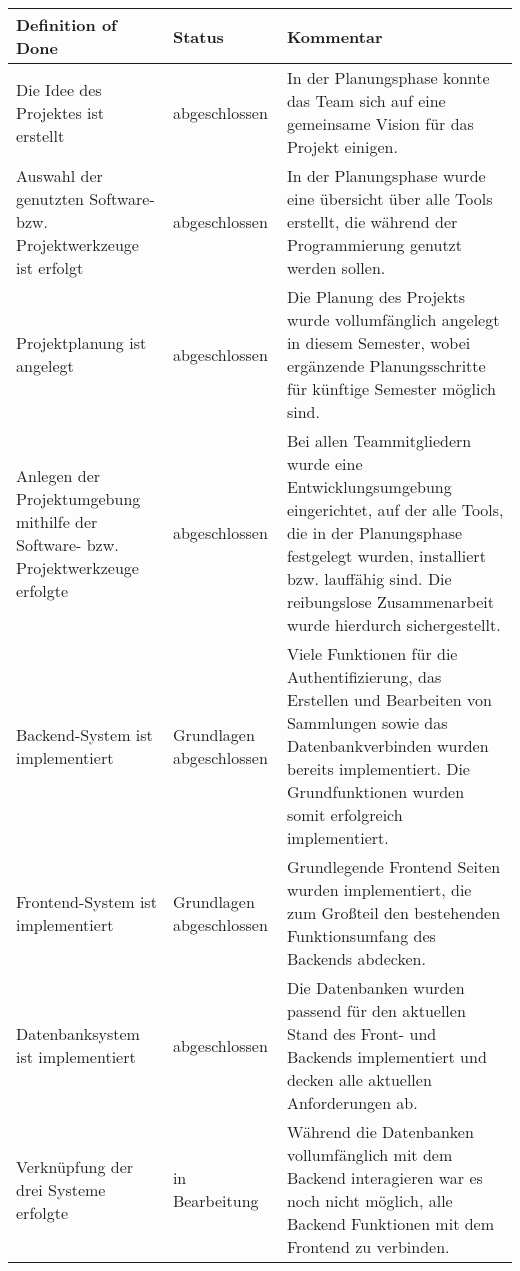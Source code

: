\begin{table}[h]
    \centering
    \begin{tabular}{|p{}|p{}|p{}|}
        \hline
        \textbf{Definition of Done} & \textbf{Status} & \textbf{Kommentar} \\
        \hline
        Die Idee des Projektes ist erstellt &  \cellcolor{green}abgeschlossen & In der Planungsphase konnte das Team sich auf eine gemeinsame Vision für das Projekt einigen. \\
        \hline
        Auswahl der genutzten Software- bzw. Projektwerkzeuge ist erfolgt & \cellcolor{green}abgeschlossen & In der Planungsphase wurde eine übersicht über alle Tools erstellt, die während der Programmierung genutzt werden sollen. \\
        \hline
        Projektplanung ist angelegt & \cellcolor{green}abgeschlossen & Die Planung des Projekts wurde vollumfänglich angelegt in diesem Semester, wobei ergänzende Planungsschritte für künftige Semester möglich sind. \\
        \hline
        Anlegen der Projektumgebung mithilfe der Software- bzw. Projektwerkzeuge erfolgte & \cellcolor{green}abgeschlossen & Bei allen Teammitgliedern wurde eine Entwicklungsumgebung eingerichtet, auf der alle Tools, die in der Planungsphase festgelegt wurden, installiert bzw. lauffähig sind.
        Die reibungslose Zusammenarbeit wurde hierdurch sichergestellt. \\
        \hline
        Backend-System ist implementiert & \cellcolor{green}Grundlagen abgeschlossen & Viele Funktionen für die Authentifizierung, das Erstellen und Bearbeiten von Sammlungen sowie das Datenbankverbinden wurden bereits implementiert.
        Die Grundfunktionen wurden somit erfolgreich implementiert. \\
        \hline
        Frontend-System ist implementiert & \cellcolor{green}Grundlagen abgeschlossen &  Grundlegende Frontend Seiten wurden implementiert, die zum Großteil den bestehenden Funktionsumfang des Backends abdecken.\\
        \hline
        Datenbanksystem ist implementiert & \cellcolor{green}abgeschlossen & Die Datenbanken wurden passend für den aktuellen Stand des Front- und Backends implementiert und decken alle aktuellen Anforderungen ab. \\
        \hline
        Verknüpfung der drei Systeme erfolgte & \cellcolor{orange}in Bearbeitung & Während die Datenbanken vollumfänglich mit dem Backend interagieren war es noch nicht möglich, alle Backend Funktionen mit dem Frontend zu verbinden.

\end{tabular}
\end{table}
